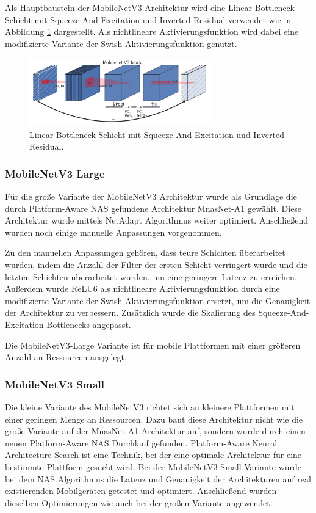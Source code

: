 Als Hauptbaustein der MobileNetV3 Architektur wird eine Linear Bottleneck Schicht mit Squeeze-And-Excitation und Inverted Residual verwendet wie in Abbildung \ref{f2.8} dargestellt. Als nichtlineare Aktivierungsfunktion wird dabei eine modifizierte Variante der Swish Aktivierungsfunktion \cite{howard_searching_2019} genutzt.

\begin{figure}[htbp]
\centerline{\includegraphics[width=0.7\textwidth]{content/images/mobilenetv3_block.png}}
\caption{Linear Bottleneck Schicht mit Squeeze-And-Excitation und Inverted Residual. \cite{howard_searching_2019}}
\label{f2.8}
\end{figure}

\subsubsection{MobileNetV3 Large}
Für die große Variante der MobileNetV3 Architektur wurde als Grundlage die durch Platform-Aware NAS gefundene Architektur MnasNet-A1 \cite{tan_mnasnet_2019} gewählt. Diese Architektur wurde mittels NetAdapt Algorithmus \cite{howard_searching_2019} weiter optimiert.
Anschließend wurden noch einige manuelle Anpassungen vorgenommen. 

Zu den manuellen Anpassungen gehören, dass teure Schichten überarbeitet wurden, indem die Anzahl der Filter der ersten Schicht verringert wurde und die letzten Schichten überarbeitet wurden, um eine geringere Latenz zu erreichen. Außerdem wurde ReLU6 als nichtlineare Aktivierungsfunktion durch eine modifizierte Variante der Swish Aktivierungsfunktion ersetzt, um die Genauigkeit der Architektur zu verbessern. Zusätzlich wurde die Skalierung des Squeeze-And-Excitation Bottlenecks angepasst.

Die MobileNetV3-Large Variante ist für mobile Plattformen mit einer größeren Anzahl an Ressourcen ausgelegt.


\subsubsection{MobileNetV3 Small}
Die kleine Variante des MobileNetV3 richtet sich an kleinere Plattformen mit einer geringen Menge an Ressourcen. Dazu baut diese Architektur nicht wie die große Variante auf der MnasNet-A1 Architektur auf, sondern wurde durch einen neuen Platform-Aware NAS Durchlauf gefunden. Platform-Aware Neural Architecture Search ist eine Technik, bei der eine optimale Architektur für eine bestimmte Plattform gesucht wird. Bei der MobileNetV3 Small Variante wurde bei dem NAS Algorithmus die Latenz und Genauigkeit der Architekturen auf real existierenden Mobilgeräten getestet und optimiert. Anschließend wurden dieselben Optimierungen wie auch bei der großen Variante angewendet.



